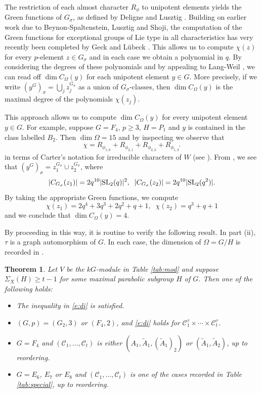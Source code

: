 \documentclass[twoside,a4paper,reqno,11pt]{amsart}
\newcommand{\s}{\sigma}
\renewcommand{\O}{\Omega}
\newcommand{\<}{\langle}
\renewcommand{\>}{\rangle}
\newcommand{\geqs}{\geqslant}
\renewcommand{\:}{\colon}
\theoremstyle{plain}
\newtheorem{thm}{Theorem}[section]
\theoremstyle{definition}
\begin{document}
The restriction of each almost character $R_{\phi}$ to unipotent elements yields the Green functions of $G_{\s}$, as defined by Deligne and Lusztig \cite{DL}. Building on earlier work due to Beynon-Spaltenstein, Lusztig and Shoji, the computation of the 
Green functions for exceptional groups of Lie type in all characteristics has very recently been completed by Geck and L\"{u}beck \cite{Geck, Lub}. This allows us to compute $\chi(z)$ for every $p$-element $z \in G_{\s}$ and in each case we obtain a polynomial in $q$. By considering the degrees of these polynomials and by appealing to Lang-Weil \cite{LW}, we can read off $\dim C_{\O}(y)$ for each unipotent element $y \in G$. More precisely, if we write $(y^G)_{\s} = \bigcup_j z_j^{G_{\s}}$ as a union of $G_{\s}$-classes, then $\dim C_{\O}(y)$ is the maximal degree of the polynomials $\chi(z_j)$. 

This approach allows us to compute $\dim C_{\O}(y)$ for every unipotent element $y \in G$. For example, suppose $G = F_4$, $p \geqs 3$, $H = P_1$ and $y$ is contained in the class labelled $B_2$. Then $\dim \O = 15$ and by inspecting \cite[p.414]{LLS2} we observe that 
\[
\chi = R_{\phi_{1,0}} + R_{\phi_{2,1}} + R_{\phi_{2,2}}+R_{\phi_{1,3}'}
\]
in terms of Carter's notation for irreducible characters of $W$ (see \cite{Car}). From \cite[Table 22.2.4]{LS_book}, we see that $(y^G)_{\s} = z_1^{G_{\s}} \cup z_2^{G_{\s}}$, where 
\[
|C_{G_{\s}}(z_1)| = 2q^{10}|{\rm SL}_2(q)|^2, \;\; |C_{G_{\s}}(z_2)| = 2q^{10}|{\rm SL}_2(q^2)|.
\]
By taking the appropriate Green functions, we compute
\[
\chi(z_1) = 2q^4+3q^3+2q^2+q+1,\;\; \chi(z_2) = q^3+q+1
\]
and we conclude that $\dim C_{\O}(y) = 4$.

By proceeding in this way, it is routine to verify the following result. In part (ii), $\tau$ is a graph automorphism of $G$. In each case, the dimension of $\O=G/H$ is recorded in \cite[Table 10]{BGS}.

\begin{thm}\label{t:par}
Let $V$ be the $kG$-module in Table \ref{tab:mod} and suppose $\Sigma_X(H) \geqs t-1$ for some maximal parabolic subgroup $H$ of $G$. 
Then one of the following holds:
\begin{itemize}\addtolength{\itemsep}{0.2\baselineskip}
\item[{\rm (i)}] The inequality in \eqref{e:di} is satisfied.
\item[{\rm (ii)}] $(G,p) = (G_2,3)$ or $(F_4,2)$, and \eqref{e:di} holds for
$\mathcal{C}_1^{\tau} \times \cdots \times \mathcal{C}_t^{\tau}$.
\item[{\rm (iii)}] $G = F_4$ and $(\mathcal{C}_1, \ldots, \mathcal{C}_t)$ is either $(A_1,\tilde{A}_1,(\tilde{A}_1)_2)$ or $(\tilde{A}_1,\tilde{A}_2)$, up to reordering.
\item[{\rm (iv)}] $G = E_6$, $E_7$ or $E_8$ and $(\mathcal{C}_1, \ldots, \mathcal{C}_t)$ is one of the cases recorded in Table \ref{tab:special}, up to reordering.
\end{itemize}
\end{thm}
\end{document}
